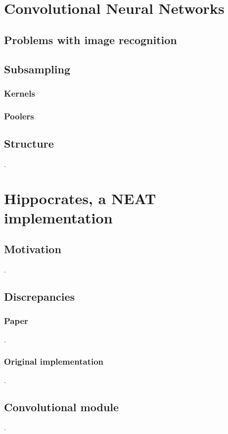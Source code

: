 \documentclass[11pt]{article}
\begin{document}
	\section{Convolutional Neural Networks}
		\subsection{Problems with image recognition}
			
		\subsection{Subsampling}
			
			\subsubsection{Kernels}
			
			\subsubsection{Poolers}
			
		\subsection{Structure}
			.
	\newpage

	\section{Hippocrates, a NEAT implementation}
		\subsection{Motivation}
			.
		\subsection{Discrepancies}
			\subsubsection{Paper}
				.
			\subsubsection{Original implementation}
				.
		\subsection{Convolutional module}
			.
		\newpage
\end{document}

